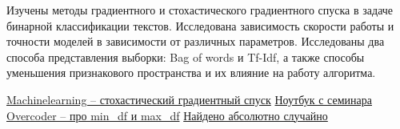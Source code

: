 \documentclass{article}
\begin{document}
Изучены методы градиентного и стохастического градиентного спуска в задаче бинарной классификации текстов. Исследована зависимость скорости работы и точности моделей в зависимости от различных параметров. Исследованы два способа представления выборки: Bag of words и Tf-Idf, а также способы уменьшения признакового пространства и их влияние на работу алгоритма. 

\newpage
{}
\begin{thebibliography}{}
     \href{http://www.machinelearning.ru/wiki/index.php?title=Стохастический_градиентный_спуск}{ Machinelearning – стохастический градиентный спуск}
     \href{https://github.com/mmp-practicum-team/mmp_practicum_fall_2022/blob/main/Seminars/08-text-processing-and-logreg/linear_classifier.ipynb}{Ноутбук с семинара}
     \href{https://overcoder.net/q/169195/понимание-mindf-и-maxdf-в-scikit-countvectorizer}{Overcoder – про min\_df и max\_df}
     \href{https://www.studocu.com/ru/document/mgu-im-lomonosova/cybersecurity/linear-regression-and-gradient-optimization/20403639}{Найдено абсолютно случайно}
    
\end{thebibliography}
\end{document}
